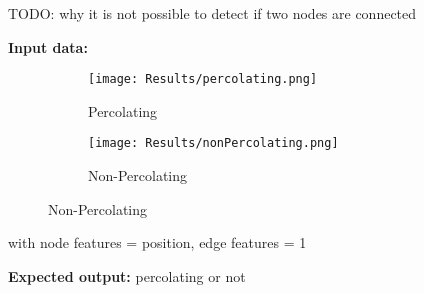 \vspace*{-0.5cm}
TODO: why it is not possible to detect if two nodes are connected \par
\textbf{Input data:}
\begin{figure}[h]
    \centering
    \begin{subfigure}[t]{0.45\textwidth}
        \centering
        \texttt{[image: Results/percolating.png]}
        \caption{Percolating}
    \end{subfigure}
    \hfill
    \begin{subfigure}[t]{0.45\textwidth}
        \centering
        \texttt{[image: Results/nonPercolating.png]}
        \caption{Non-Percolating}
    \end{subfigure}
\end{figure}
with node features = position, edge features = 1\par
\textbf{Expected output:} percolating or not